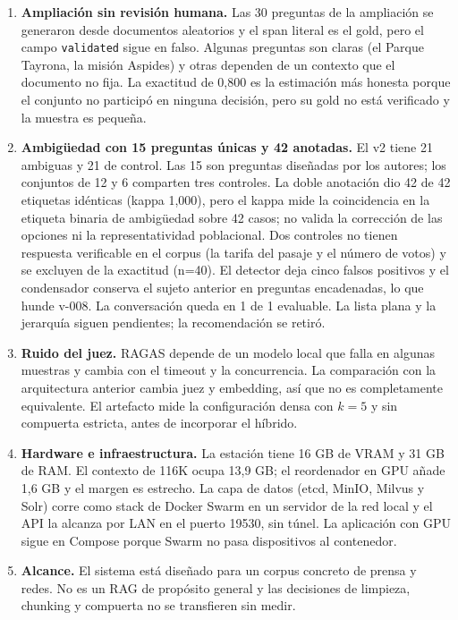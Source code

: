 \begin{enumerate}
\item \textbf{Ampliaci\'on sin revisi\'on humana.} Las 30 preguntas de la ampliaci\'on se generaron desde documentos aleatorios y el span literal es el gold, pero el campo \texttt{validated} sigue en falso. Algunas preguntas son claras (el Parque Tayrona, la misi\'on Aspides) y otras dependen de un contexto que el documento no fija. La exactitud de 0,800 es la estimaci\'on m\'as honesta porque el conjunto no particip\'o en ninguna decisi\'on, pero su gold no est\'a verificado y la muestra es peque\~na.
\item \textbf{Ambig\"uedad con 15 preguntas \'unicas y 42 anotadas.} El v2 tiene 21 ambiguas y 21 de control. Las 15 son preguntas dise\~nadas por los autores; los conjuntos de 12 y 6 comparten tres controles. La doble anotaci\'on dio 42 de 42 etiquetas id\'enticas (kappa 1,000), pero el kappa mide la coincidencia en la etiqueta binaria de ambig\"uedad sobre 42 casos; no valida la correcci\'on de las opciones ni la representatividad poblacional. Dos controles no tienen respuesta verificable en el corpus (la tarifa del pasaje y el n\'umero de votos) y se excluyen de la exactitud (n=40). El detector deja cinco falsos positivos y el condensador conserva el sujeto anterior en preguntas encadenadas, lo que hunde v-008. La conversaci\'on queda en 1 de 1 evaluable. La lista plana y la jerarqu\'ia siguen pendientes; la recomendaci\'on se retir\'o.
\item \textbf{Ruido del juez.} RAGAS depende de un modelo local que falla en algunas muestras y cambia con el timeout y la concurrencia. La comparaci\'on con la arquitectura anterior cambia juez y embedding, as\'i que no es completamente equivalente. El artefacto mide la configuraci\'on densa con $k=5$ y sin compuerta estricta, antes de incorporar el h\'ibrido.
\item \textbf{Hardware e infraestructura.} La estaci\'on tiene 16 GB de VRAM y 31 GB de RAM. El contexto de 116K ocupa 13,9 GB; el reordenador en GPU a\~nade 1,6 GB y el margen es estrecho. La capa de datos (etcd, MinIO, Milvus y Solr) corre como stack de Docker Swarm en un servidor de la red local y el API la alcanza por LAN en el puerto 19530, sin t\'unel. La aplicaci\'on con GPU sigue en Compose porque Swarm no pasa dispositivos al contenedor.
\item \textbf{Alcance.} El sistema est\'a dise\~nado para un corpus concreto de prensa y redes. No es un RAG de prop\'osito general y las decisiones de limpieza, chunking y compuerta no se transfieren sin medir.
\end{enumerate}
